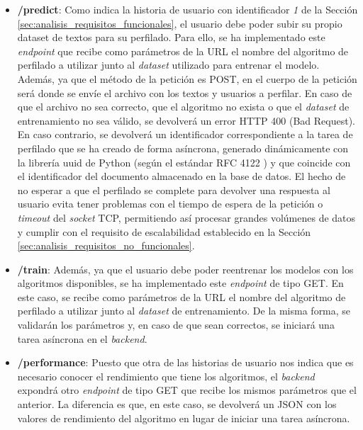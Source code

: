 \begin{itemize}
	\item \textbf{/predict}: Como indica la historia de usuario con identificador \textit{1} de la Sección \ref{sec:analisis_requisitos_funcionales}, el usuario
		debe poder subir su propio dataset de textos para su perfilado. Para ello, se ha implementado este \textit{endpoint} que recibe como parámetros de la URL el
		nombre del algoritmo de perfilado a utilizar junto al \textit{dataset} utilizado para entrenar el modelo. Además, ya que el método de la petición es POST,
		en el cuerpo de la petición será donde se envíe
		el archivo con los textos y usuarios a perfilar. En caso de que el archivo no sea correcto, que el algoritmo no exista o que el \textit{dataset} de entrenamiento
		no sea válido, se devolverá un error HTTP 400 (Bad Request). En caso contrario, se devolverá un identificador correspondiente a la tarea de perfilado
		que se ha creado de forma asíncrona, generado dinámicamente con la librería uuid \cite{uuidpython} de Python (según el estándar RFC 4122 \cite{rfc4122}) y que coincide
		con el identificador del documento almacenado en la base de datos. 
		El hecho de no esperar a que el perfilado se complete 
		para devolver una respuesta al usuario evita tener problemas con el tiempo de espera de la petición o \textit{timeout} del \textit{socket} TCP, 
		permitiendo así procesar grandes volúmenes de datos y cumplir con el requisito de escalabilidad establecido en la Sección \ref{sec:analisis_requisitos_no_funcionales}.

	\item \textbf{/train}: Además, ya que el usuario debe poder reentrenar los modelos con los algoritmos disponibles, se ha implementado este \textit{endpoint} de tipo GET.
		En este caso, se recibe como parámetros de la URL el nombre del algoritmo de perfilado a utilizar junto al \textit{dataset} de entrenamiento. De la misma forma,
		se validarán los parámetros y, en caso de que sean correctos, se iniciará una tarea asíncrona en el \textit{backend}.

	\item \textbf{/performance}: Puesto que otra de las historias de usuario nos indica que es necesario conocer el rendimiento que tiene los algoritmos,
		el \textit{backend} expondrá otro \textit{endpoint} de tipo GET que recibe los mismos parámetros que el anterior. La diferencia es que, en este caso,
		se devolverá un JSON con los valores de rendimiento del algoritmo en lugar de iniciar una tarea asíncrona.
	

\end{itemize}
